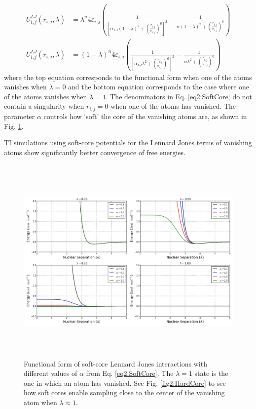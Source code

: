 \begin{align}
   U^{LJ}_{i,j}(r_{i,j}, \lambda) & = \lambda ^ n 4 \varepsilon_{i,j} \left(
      \frac 1 {\left[ \alpha_{LJ} (1-\lambda)^2 + \left( \frac {r_{i,j}}
      {\sigma_{i,j}} \right) ^ 6 \right] ^ 2} - \frac 1 {\alpha(1-\lambda)^2 +
      \left( \frac {r_{i,j}} {\sigma_{i,j}} \right) ^ 6} \right) \nonumber \\
   U^{LJ}_{i,j}(r_{i,j}, \lambda) & = (1-\lambda) ^ n 4 \varepsilon_{i,j} \left(
      \frac 1 {\left[ \alpha_{LJ} \lambda^2 + \left( \frac {r_{i,j}}
      {\sigma_{i,j}} \right) ^ 6 \right] ^ 2} - \frac 1 {\alpha \lambda^2 +
      \left( \frac {r_{i,j}} {\sigma_{i,j}} \right) ^ 6} \right)
   \label{eq2:SoftCore}
\end{align}
where the top equation corresponds to the functional form when one of the atoms
vanishes when $\lambda = 0$ and the bottom equation corresponds to the case
where one of the atoms vanishes when $\lambda = 1$. The denominators in Eq.
\ref{eq2:SoftCore} do not contain a singularity when $r_{i,j} = 0$ when one of
the atoms has vanished. The parameter $\alpha$ controls how `soft' the core of
the vanishing atoms are, as shown in Fig. \ref{fig2:SoftCore}.
\cite{Steinbrecher_JChemPhys_2007_v127_p214108}

TI simulations using soft-core potentials for the Lennard Jones terms of
vanishing atoms show significantly better convergence of free energies.
\cite{Steinbrecher_JChemPhys_2007_v127_p214108, Steinbrecher2011}

\begin{figure}
   \includegraphics[width=6.5in, height=4.06in]{SoftCore.png}
   \caption{Functional form of soft-core Lennard Jones interactions with
            different values of $\alpha$ from Eq. \ref{eq2:SoftCore}. The
            $\lambda = 1$ state is the one in which an atom has vanished. See
            Fig. \ref{fig2:HardCore} to see how soft cores enable sampling close
            to the center of the vanishing atom when $\lambda \approx 1$.}
   \label{fig2:SoftCore}
\end{figure}

